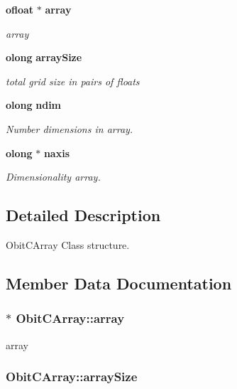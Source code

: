 \begin{CompactItemize}
{\bf ofloat} $\ast$ {\bf array}
\begin{CompactList}\small\item\em array \item\end{CompactList}\item 
{\bf olong} {\bf array\-Size}
\begin{CompactList}\small\item\em total grid size in pairs of floats \item\end{CompactList}\item 
{\bf olong} {\bf ndim}
\begin{CompactList}\small\item\em Number dimensions in array. \item\end{CompactList}\item 
{\bf olong} $\ast$ {\bf naxis}
\begin{CompactList}\small\item\em Dimensionality array. \item\end{CompactList}\end{CompactItemize}


\subsection{Detailed Description}
Obit\-CArray Class structure. 



\subsection{Member Data Documentation}
\subsubsection{$\ast$ {\bf Obit\-CArray::array}}\label{structObitCArray_o6}


array 

\subsubsection{ {\bf Obit\-CArray::array\-Size}}\label{structObitCArray_o7}


